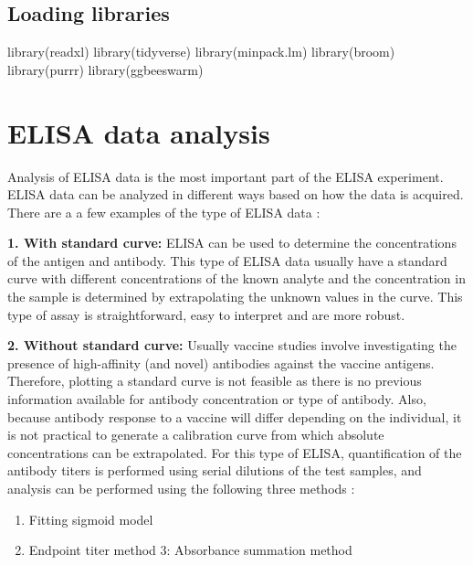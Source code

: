 \documentclass[
]{book}
\newenvironment{Shaded}{\begin{snugshade}}{\end{snugshade}}
\newcommand{\FunctionTok}[1]{\textcolor[rgb]{0.00,0.00,0.00}{#1}}
\newcommand{\NormalTok}[1]{#1}
\providecommand{\tightlist}{%
  \setlength{\itemsep}{0pt}\setlength{\parskip}{0pt}}
\begin{document}
\hypertarget{loading-libraries}{%
\subsection{Loading libraries}\label{loading-libraries}}

\begin{Shaded}
\begin{Highlighting}[]
\FunctionTok{library}\NormalTok{(readxl)}
\FunctionTok{library}\NormalTok{(tidyverse)}
\FunctionTok{library}\NormalTok{(minpack.lm)}
\FunctionTok{library}\NormalTok{(broom)}
\FunctionTok{library}\NormalTok{(purrr)}
\FunctionTok{library}\NormalTok{(ggbeeswarm)}
\end{Highlighting}
\end{Shaded}

\hypertarget{elisa-data-analysis}{%
\section{ELISA data analysis}\label{elisa-data-analysis}}

Analysis of ELISA data is the most important part of the ELISA experiment. ELISA data can be analyzed in different ways based on how the data is acquired. There are a a few examples of the type of ELISA data :

\textbf{1. With standard curve:} ELISA can be used to determine the concentrations of the antigen and antibody. This type of ELISA data usually have a standard curve with
different concentrations of the known analyte and the concentration in the sample is determined by extrapolating the unknown values in the curve. This type of assay is straightforward, easy to interpret and are more robust.

\textbf{2. Without standard curve:} Usually vaccine studies involve investigating the presence of high-affinity (and novel) antibodies against the vaccine antigens.
Therefore, plotting a standard curve is not feasible as there is no previous information available for antibody concentration or type of antibody. Also, because antibody response to a vaccine will differ depending on the individual,
it is not practical to generate a calibration curve from which absolute concentrations can be extrapolated.
For this type of ELISA, quantification of the antibody titers is performed using serial dilutions of the test samples, and analysis can be performed using the following three methods \citep{hartman2018absorbance}:

\begin{enumerate}
\def\labelenumi{\arabic{enumi}.}
\tightlist
\item
  Fitting sigmoid model
\item
  Endpoint titer method
  3: Absorbance summation method
\end{enumerate}
\end{document}
